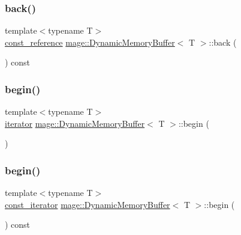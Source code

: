 \subsubsection{\texorpdfstring{back()}{back()}\hspace{0.1cm}{\footnotesize\ttfamily [2/2]}}
{\footnotesize\ttfamily template$<$typename T$>$ \\
\mbox{\hyperlink{classmage_1_1_dynamic_memory_buffer_aa454489303e19392c54044d3b3ae67ad}{const\+\_\+reference}} \mbox{\hyperlink{classmage_1_1_dynamic_memory_buffer}{mage\+::\+Dynamic\+Memory\+Buffer}}$<$ T $>$\+::back (\begin{DoxyParamCaption}{ }\end{DoxyParamCaption}) const\hspace{0.3cm}{\ttfamily [noexcept]}}

\mbox{\label{classmage_1_1_dynamic_memory_buffer_af03830fa33bbd63d09ae138ba5c742c2}} 
\subsubsection{\texorpdfstring{begin()}{begin()}\hspace{0.1cm}{\footnotesize\ttfamily [1/2]}}
{\footnotesize\ttfamily template$<$typename T$>$ \\
\mbox{\hyperlink{classmage_1_1_dynamic_memory_buffer_aa5dca8e81d0c2a9e63d3a9bc61cce904}{iterator}} \mbox{\hyperlink{classmage_1_1_dynamic_memory_buffer}{mage\+::\+Dynamic\+Memory\+Buffer}}$<$ T $>$\+::begin (\begin{DoxyParamCaption}{ }\end{DoxyParamCaption})\hspace{0.3cm}{\ttfamily [noexcept]}}

\mbox{\label{classmage_1_1_dynamic_memory_buffer_ab9fab8bb0520cb58935e45244194536a}} 
\subsubsection{\texorpdfstring{begin()}{begin()}\hspace{0.1cm}{\footnotesize\ttfamily [2/2]}}
{\footnotesize\ttfamily template$<$typename T$>$ \\
\mbox{\hyperlink{classmage_1_1_dynamic_memory_buffer_ad6f32f829dcde2a912f53ed18080ab9c}{const\+\_\+iterator}} \mbox{\hyperlink{classmage_1_1_dynamic_memory_buffer}{mage\+::\+Dynamic\+Memory\+Buffer}}$<$ T $>$\+::begin (\begin{DoxyParamCaption}{ }\end{DoxyParamCaption}) const\hspace{0.3cm}{\ttfamily [noexcept]}}

